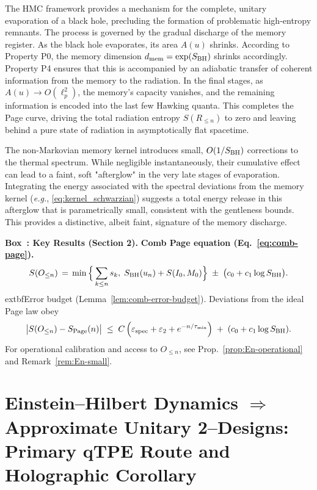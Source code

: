 \documentclass[aps,prd,preprint,onecolumn,superscriptaddress,nofootinbib,longbibliography,floatfix,11pt,showpacs,showkeys]{revtex4-2}
\newcommand{\eg}{\textit{e.g.}\xspace}
\newcommand{\HMC}{\textsc{HMC}\xspace}
\newcounter{boxedresult}
\newenvironment{boxedresult}[1]{\refstepcounter{boxedresult}\begin{infobox}\noindent\textbf{Box~\theboxedresult: #1.}}{\end{infobox}}
\theoremstyle{plain}
\theoremstyle{definition}
\theoremstyle{remark}
\begin{document}
The \HMC{} framework provides a mechanism for the complete, unitary evaporation of a black hole, precluding the formation of problematic high-entropy remnants. The process is governed by the gradual discharge of the memory register.
As the black hole evaporates, its area $A(u)$ shrinks. According to Property P0, the memory dimension $d_{\rm mem} = \exp(S_{\rm BH})$ shrinks accordingly. Property P4 ensures that this is accompanied by an adiabatic transfer of coherent information from the memory to the radiation. In the final stages, as $A(u)\to O(\ell_p^2)$, the memory's capacity vanishes, and the remaining information is encoded into the last few Hawking quanta. This completes the Page curve, driving the total radiation entropy $S(R_{\le n})$ to zero and leaving behind a pure state of radiation in asymptotically flat spacetime.

The non-Markovian memory kernel introduces small, $O(1/S_{\rm BH})$ corrections to the thermal spectrum. While negligible instantaneously, their cumulative effect can lead to a faint, soft "afterglow" in the very late stages of evaporation. Integrating the energy associated with the spectral deviations from the memory kernel (\eg, \eqref{eq:kernel_schwarzian}) suggests a total energy release in this afterglow that is parametrically small, consistent with the gentleness bounds. This provides a distinctive, albeit faint, signature of the memory discharge.

\begin{boxedresult}{Key Results (Section 2)}\label{box:key-results-sec2}
\noindent\textbf{Comb Page equation (Eq.~\eqref{eq:comb-page}).}
\[
S(O_{\le n}) \,=\, \min\Big\{\sum_{k\le n} s_k,\; S_{\rm BH}(u_n)+S(I_0,M_0)\Big\}\;\pm\;\big(c_0+c_1\log S_{\rm BH}\big).
\]
    extbf{Error budget (Lemma~\ref{lem:comb-error-budget}).} Deviations from the ideal Page law obey
\[
\big|S(O_{\le n})-S_{\rm Page}(n)\big|\;\le\; C\,\Big(\varepsilon_{\rm spec}+\varepsilon_2+e^{-n/\tau_{\rm mix}}\Big)\; +\; (c_0+c_1\log S_{\rm BH}).
\]
For operational calibration and access to $O_{\le n}$, see Prop.~\ref{prop:En-operational} and Remark~\ref{rem:En-small}.
\end{boxedresult}

\section{Einstein--Hilbert Dynamics \texorpdfstring{$\Rightarrow$}{Implies} Approximate Unitary 2--Designs: Primary qTPE Route and Holographic Corollary}
\label{sec:eh2design_main}
\label{sec:EH-to-design}
\label{sec:eh2design}
\label{sec:qTPE}
\end{document}
